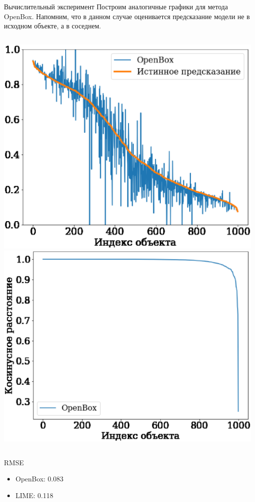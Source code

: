 \documentclass{beamer}
\begin{document}
\begin{frame}{Вычислительный эксперимент}
Построим аналогичные графики для метода OpenBox. Напомним, что в данном случае оценивается предсказание модели не в исходном объекте, а в соседнем.
\begin{columns}[c]
\includegraphics[width=\textwidth]{../figures/openbox_proba_est.eps}
\includegraphics[width=\textwidth]{../figures/openbox_cosine.eps}
\end{columns}
\begin{columns}[c]
\begin{block}{RMSE}
\begin{itemize}
    \item OpenBox: 0.083
    \item LIME: 0.118
\end{itemize}
\end{block}
\end{columns}

\end{frame}
\end{document}
